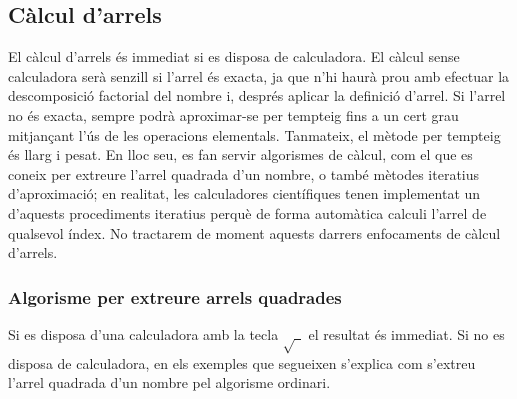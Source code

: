 \subsection{Càlcul d’arrels}

El càlcul d’arrels és immediat si es disposa de calculadora. El càlcul sense calculadora serà senzill si l’arrel és exacta,
ja que n’hi haurà prou amb efectuar la descomposició factorial del nombre i, després aplicar la definició d’arrel. Si l’arrel
no és exacta, sempre podrà aproximar-se per tempteig fins a un cert grau
mitjançant l’ús de les operacions elementals. Tanmateix, el mètode
per tempteig és llarg i pesat. En lloc seu, es fan servir algorismes de càlcul, com el que es coneix per extreure l’arrel quadrada d’un nombre, o també mètodes iteratius d’aproximació; en realitat,
les calculadores científiques tenen implementat un d’aquests
procediments iteratius perquè de forma automàtica calculi l’arrel de qualsevol índex. No tractarem de moment aquests darrers enfocaments de càlcul d’arrels.

\subsubsection{Algorisme per extreure arrels quadrades}

Si es disposa d’una calculadora amb la tecla $\sqrt{~~}$ el resultat és
immediat. Si no es disposa de calculadora, en els exemples que segueixen s’explica com s’extreu l’arrel quadrada d’un nombre pel
algorisme ordinari.

